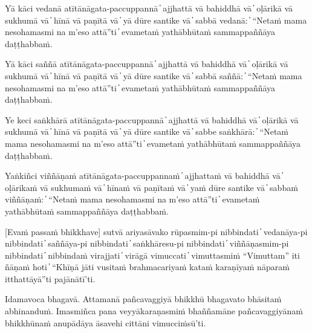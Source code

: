Yā kāci vedanā atītānāgata-paccuppannā  ̓  ajjhattā vā bahiddhā vā  ̓  oḷārikā vā sukhumā vā  ̓  hīnā vā paṇītā vā  ̓  yā dūre santike vā  ̓  sabbā vedanā:  ̓  “Netaṁ mama nesohamasmi na m’eso attā”ti  ̓  evametaṁ yathābhūtaṁ sammappaññāya daṭṭhabbaṁ.

Yā kāci saññā atītānāgata-paccuppannā  ̓  ajjhattā vā bahiddhā vā  ̓  oḷārikā vā sukhumā vā  ̓  hīnā vā paṇītā vā  ̓  yā dūre santike vā  ̓  sabbā saññā:  ̓  “Netaṁ mama nesohamasmi na m’eso attā”ti  ̓  evametaṁ yathābhūtaṁ sammappaññāya daṭṭhabbaṁ.

Ye keci saṅkhārā atītānāgata-paccuppannā  ̓  ajjhattā vā bahiddhā vā  ̓  oḷārikā vā sukhumā vā  ̓  hīnā vā paṇītā vā  ̓  yā dūre santike vā  ̓  sabbe saṅkhārā:  ̓  “Netaṁ mama nesohamasmi na m’eso attā”ti  ̓  evametaṁ yathābhūtaṁ sammappaññāya daṭṭhabbaṁ.

Yaṅkiñci viññāṇaṁ atītānāgata-paccuppannaṁ  ̓  ajjhattaṁ vā bahiddhā vā  ̓  oḷārikaṁ vā sukhumaṁ vā  ̓  hīnaṁ vā paṇītaṁ vā  ̓  yaṁ dūre santike vā  ̓  sabbaṁ viññāṇaṁ:  ̓  “Netaṁ mama nesohamasmi na m’eso attā”ti  ̓  evametaṁ yathābhūtaṁ sammappaññāya daṭṭhabbaṁ.

[Evaṁ passaṁ bhikkhave] sutvā ariyasāvako rūpasmim-pi nibbindati  ̓  vedanāya-pi nibbindati  ̓  saññāya-pi nibbindati  ̓  saṅkhāresu-pi nibbindati  ̓  viññāṇasmim-pi nibbindati  ̓  nibbindaṁ virajjati  ̓  virāgā vimuccati  ̓  vimuttasmiṁ “Vimuttam” iti ñāṇaṁ hoti  ̓  “Khīṇā jāti vusitaṁ brahmacariyaṁ kataṁ karaṇīyaṁ nāparaṁ itthattāyā”ti pajānātī’ti.

Idamavoca bhagavā. Attamanā pañcavaggiyā bhikkhū bhagavato bhāsitaṁ abhinanduṁ. Imasmiñca pana veyyākaraṇasmiṁ bhaññamāne pañcavaggiyānaṁ bhikkhūnaṁ anupādāya āsavehi cittāni vimucciṁsū’ti.

\suttaRef{[SN 22.59]}
